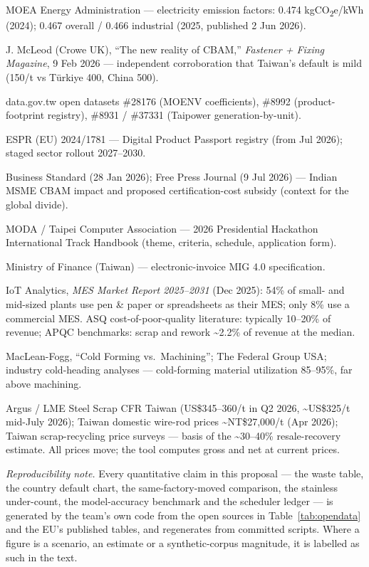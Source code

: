\documentclass[11pt]{article}
\newcommand{\euro}{\texteuro}
\begin{document}
\begin{enumerate}[leftmargin=2.2em,itemsep=1.5pt,label={[\arabic*]}]
\item MOEA Energy Administration --- electricity emission factors: 0.474 kgCO\textsubscript{2}e/kWh (2024); 0.467 overall / 0.466 industrial (2025, published 2 Jun 2026).
\item J. McLeod (Crowe UK), ``The new reality of CBAM,'' \emph{Fastener + Fixing Magazine}, 9 Feb 2026 --- independent corroboration that Taiwan's default is mild (\euro{}150/t vs Türkiye \euro{}400, China \euro{}500).
\item data.gov.tw open datasets \#28176 (MOENV coefficients), \#8992 (product-footprint registry), \#8931 / \#37331 (Taipower generation-by-unit).
\item ESPR (EU) 2024/1781 --- Digital Product Passport registry (from Jul 2026); staged sector rollout 2027--2030.
\item Business Standard (28 Jan 2026); Free Press Journal (9 Jul 2026) --- Indian MSME CBAM impact and proposed certification-cost subsidy (context for the global divide).
\item MODA / Taipei Computer Association --- 2026 Presidential Hackathon International Track Handbook (theme, criteria, schedule, application form).
\item Ministry of Finance (Taiwan) --- electronic-invoice MIG 4.0 specification.
\item IoT Analytics, \emph{MES Market Report 2025--2031} (Dec 2025): 54\% of small- and mid-sized plants use pen \& paper or spreadsheets as their MES; only 8\% use a commercial MES. ASQ cost-of-poor-quality literature: typically 10--20\% of revenue; APQC benchmarks: scrap and rework \textasciitilde2.2\% of revenue at the median.
\item MacLean-Fogg, ``Cold Forming vs.\ Machining''; The Federal Group USA; industry cold-heading analyses --- cold-forming material utilization 85--95\%, far above machining.
\item Argus / LME Steel Scrap CFR Taiwan (US\$345--360/t in Q2 2026, \textasciitilde US\$325/t mid-July 2026); Taiwan domestic wire-rod prices \textasciitilde NT\$27{,}000/t (Apr 2026); Taiwan scrap-recycling price surveys --- basis of the \textasciitilde30--40\% resale-recovery estimate. All prices move; the tool computes gross and net at current prices.
\end{enumerate}

\vfill
{\footnotesize\color{cpgrey}\emph{Reproducibility note.} Every quantitative claim in this proposal --- the waste table, the country default chart, the same-factory-moved comparison, the stainless under-count, the model-accuracy benchmark and the scheduler ledger --- is generated by the team's own code from the open sources in Table~\ref{tab:opendata} and the EU's published tables, and regenerates from committed scripts. Where a figure is a scenario, an estimate or a synthetic-corpus magnitude, it is labelled as such in the text.}
\end{document}
